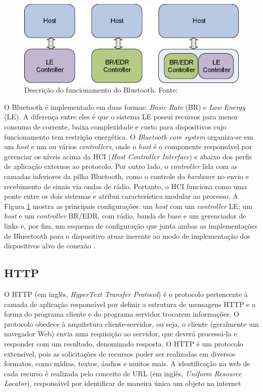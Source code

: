 \begin{figure}[ht]
    \centering
    \includegraphics[width=.48\textwidth]{img/blueetooth-comunication.png}
    \caption{Descrição do funcionamento do Bluetooth. Fonte: \cite{bluetoothDocumentation}}\label{figBluetooth}
\end{figure}

O Bluetooth é implementado em duas formas: \textit{Basic Rate} (BR) e \textit{Low Energy} (LE). A diferença entre eles é que o sistema LE
possui recursos para menor consumo de corrente, baixa complexidade e custo para dispositivos cujo funcionamento tem restrição energética. O \textit{Bluetooth core system} 
organiza-se em um \textit{host} e um ou vários \textit{controllers}, onde o \textit{host} é o componente responsável 
por gerenciar os níveis acima da HCI (\textit{Host Controller Interface}) e abaixo dos perfis de aplicação externos ao protocolo. Por outro lado, o \textit{controller} 
lida com as camadas inferiores da pilha Bluetooth, como o controle do \textit{hardware} no envio e recebimento de sinais via ondas de rádio. Portanto, o 
HCI funciona como uma ponte entre os dois sistemas e atribui característica modular ao processo. A Figura \ref{figBluetooth} mostra as principais configurações: um \textit{host} com um \textit{controller} LE; 
um \textit{host} e um \textit{controller} BR/EDR, com rádio, banda de base e um gerenciador de links e, por fim, um esquema de configuração que junta ambas as implementações de Blueetooth para o dispositivo atuar inerente 
ao modo de implementação dos dispositivos alvo de conexão \cite{bluetoothDocumentation}.

\subsection{HTTP}

O HTTP (em inglês, \textit{HyperText Transfer Protocol}) é o protocolo pertencente à camada de aplicação responsável por definir a estrutura de mensagens HTTP e a forma do programa cliente e do programa servidor 
trocarem informações. O protocolo obedece à arquitetura cliente-servidor, ou seja, o cliente (geralmente um navegador Web) envia uma requisição ao servidor, que deverá processá-la e responder com um resultado, denominado resposta. O HTTP é um protocolo extensível, pois 
as solicitações de recursos poder ser realizadas em diversos formatos, como mídias, textos, áudios e muitos mais. A identificação na web de cada recurso é realizada pelo conceito de URL (em inglês, \textit{Uniform Resource Locator}), responsável por identificar de maneira única um objeto na internet \cite[pp. 72]{redeskurose2010}

